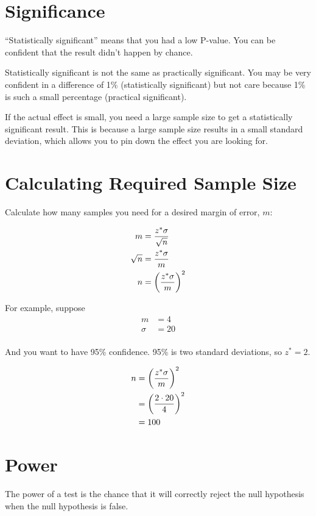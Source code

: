 \documentclass[letterpaper, landscape]{exam}
\begin{document}
  \section{Significance}
  ``Statistically significant'' means that you had a low P-value. You can be
  confident that the result didn't happen by chance.

  Statistically significant is not the same as practically significant. You may be
  very confident in a difference of 1\% (statistically significant) but not care
  because 1\% is such a small percentage (practical significant).

  If the actual effect is small, you need a large sample size to get a
  statistically significant result. This is because a large sample size results
  in a small standard deviation, which allows you to pin down the effect you are
  looking for.

  \section{Calculating Required Sample Size}

  Calculate how many samples you need for a desired margin of error, $m$:

  \begin{align*}
    m        & = \frac{z^* \sigma}{\sqrt{n}} \\
    \sqrt{n} & = \frac{z^* \sigma}{m} \\
    n        & = \del{ \frac{z^* \sigma}{m} }^2 \\
  \end{align*}

  For example, suppose 
  \begin{align*}
    m      & = 4 \\
    \sigma & = 20 \\
  \end{align*}
  
  And you want to have 95\% confidence.  95\% is two standard deviations, so
  $z^* = 2$. 

  \begin{align*}
    n & = \del{ \frac{z^* \sigma}{m} }^2 \\
      & = \del{ \frac{2 \cdot 20}{4} }^2 \\
      & = 100 \\
  \end{align*}

  \section{Power}
  The power of a test is the chance that it will correctly reject the null
  hypothesis when the null hypothesis is false.
\end{document}
